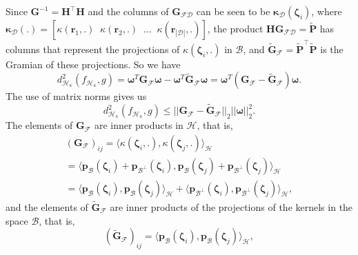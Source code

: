 Since $\mathbf{G}^{-1} = \mathbf{H}^\top\mathbf{H}$ and the columns of $\mathbf{G}_{\mathcal{FD}}$ can be seen to be $\boldsymbol{\kappa}_{\mathcal{D}}(\boldsymbol{\zeta}_i)$, where $\boldsymbol{\kappa}_{\mathcal{D}}(.) = [\kappa(\mathbf{r}_1,.) \;\; \kappa(\mathbf{r}_2,.) \;\; \dots \;\; \kappa(\mathbf{r}_{|\mathcal{D}|},.)]$,
the product $\mathbf{H}\mathbf{G}_{\mathcal{F\mathcal{D}}} = \tilde{\mathbf{P}}$ has columns that represent the projections of $\kappa(\boldsymbol{\zeta}_i,.)$ in $\mathcal{B}$, and $\tilde{\mathbf{G}}_\mathcal{F} = \tilde{\mathbf{P}}^\top\tilde{\mathbf{P}}$ is the Gramian of these projections. So we have
\begin{equation}
    d_{\mathcal{H}_{\kappa}}^2(f_{\mathcal{H}_\kappa},g)  = \boldsymbol{\omega}^{T}\mathbf{G}_{\mathcal{F}}\boldsymbol{\omega} - \boldsymbol{\omega}^{T}\tilde{\mathbf{G}}_{\mathcal{F}}\boldsymbol{\omega} = \boldsymbol{\omega}^{T}(\mathbf{G}_{\mathcal{F}} - \tilde{\mathbf{G}}_{\mathcal{F}})\boldsymbol{\omega}.
\end{equation}
The use of matrix norms \cite{horn_matrix_2017} gives us
\begin{equation}
    d_{\mathcal{H}_{\kappa}}^2(f_{\mathcal{H}_\kappa},g)  \leq ||\mathbf{G}_{\mathcal{F}} - \tilde{\mathbf{G}}_{\mathcal{F}}||_2 ||\boldsymbol{\omega}||^2_2.
\end{equation}
The elements of $\mathbf{G}_{\mathcal{F}}$ are inner products in $\mathcal{H}$, that is,
\begin{multline}
    \left( \mathbf{G}_{\mathcal{F}}\right)_{ij} = \langle \kappa(\boldsymbol{\zeta}_i,.),\kappa(\boldsymbol{\zeta}_j,.) \rangle_{\mathcal{H}}\\
    = \langle \mathbf{p}_{\mathcal{B}}(\boldsymbol{\zeta}_i) + \mathbf{p}_{\mathcal{B}^{\perp}}(\boldsymbol{\zeta}_i), \mathbf{p}_{\mathcal{B}}(\boldsymbol{\zeta}_j) + \mathbf{p}_{\mathcal{B}^{\perp}}(\boldsymbol{\zeta}_j) \rangle_{\mathcal{H}}\\
    = \langle \mathbf{p}_{\mathcal{B}}(\boldsymbol{\zeta}_i),\mathbf{p}_{\mathcal{B}}(\boldsymbol{\zeta}_j)\rangle_{\mathcal{H}} + \langle \mathbf{p}_{\mathcal{B}^\perp}(\boldsymbol{\zeta}_i),\mathbf{p}_{\mathcal{B}^\perp}(\boldsymbol{\zeta}_j)\rangle_{\mathcal{H}},
\end{multline}
and the elements of $\tilde{\mathbf{G}}_{\mathcal{F}}$ are inner products of the projections of the kernels in the space $\mathcal{B}$, that is,
\begin{equation}
    \left( \tilde{\mathbf{G}}_{\mathcal{F}}\right)_{ij} = \langle \mathbf{p}_{\mathcal{B}}(\boldsymbol{\zeta}_i),\mathbf{p}_{\mathcal{B}}(\boldsymbol{\zeta}_j)\rangle_{\mathcal{H}},
\end{equation}
